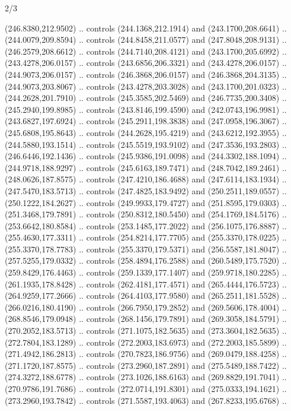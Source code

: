 \begin{flagdescription}{2/3}
\begin{scope}[xshift=0.5\flaglength,yshift=0.5\flagwidth,scale=\flagwidth/318.91]
\begin{scope}[y=0.8pt, x=0.8pt, yscale=-1,shift={(-298.97,-199.32)}]
  (246.8380,212.9502) .. controls (244.1368,212.1914) and (243.1700,208.6641) ..
  (244.0079,209.8594) .. controls (244.8458,211.0577) and (247.8048,208.9131) ..
  (246.2579,208.6612) .. controls (244.7140,208.4121) and (243.1700,205.6992) ..
  (243.4278,206.0157) .. controls (243.6856,206.3321) and (243.4278,206.0157) ..
  (244.9073,206.0157) .. controls (246.3868,206.0157) and (246.3868,204.3135) ..
  (244.9073,203.8067) .. controls (243.4278,203.3028) and (243.1700,201.0323) ..
  (244.2628,201.7910) .. controls (245.3585,202.5469) and (246.7735,200.3408) ..
  (245.2940,199.8985) .. controls (243.8146,199.4590) and (242.0743,196.9981) ..
  (243.6827,197.6924) .. controls (245.2911,198.3838) and (247.0958,196.3067) ..
  (245.6808,195.8643) .. controls (244.2628,195.4219) and (243.6212,192.3955) ..
  (244.5880,193.1514) .. controls (245.5519,193.9102) and (247.3536,193.2803) ..
  (246.6446,192.1436) .. controls (245.9386,191.0098) and (244.3302,188.1094) ..
  (244.9718,188.9297) .. controls (245.6163,189.7471) and (248.7042,189.2461) ..
  (248.0626,187.8575) .. controls (247.4210,186.4688) and (247.6114,183.1934) ..
  (247.5470,183.5713) .. controls (247.4825,183.9492) and (250.2511,189.0557) ..
  (250.1222,184.2627) .. controls (249.9933,179.4727) and (251.8595,179.0303) ..
  (251.3468,179.7891) .. controls (250.8312,180.5450) and (254.1769,184.5176) ..
  (253.6642,180.8584) .. controls (253.1485,177.2022) and (256.1075,176.8887) ..
  (255.4630,177.3311) .. controls (254.8214,177.7705) and (255.3370,178.0225) ..
  (255.3370,178.7783) .. controls (255.3370,179.5371) and (256.5587,181.8047) ..
  (257.5255,179.0332) .. controls (258.4894,176.2588) and (260.5489,175.7520) ..
  (259.8429,176.4463) .. controls (259.1339,177.1407) and (259.9718,180.2285) ..
  (261.1935,178.8428) .. controls (262.4181,177.4571) and (265.4444,176.5723) ..
  (264.9259,177.2666) .. controls (264.4103,177.9580) and (265.2511,181.5528) ..
  (266.0216,180.4190) .. controls (266.7950,179.2852) and (269.5606,178.4004) ..
  (268.8546,179.0948) .. controls (268.1456,179.7891) and (269.3058,184.5791) ..
  (270.2052,183.5713) .. controls (271.1075,182.5635) and (273.3604,182.5635) ..
  (272.7804,183.1289) .. controls (272.2003,183.6973) and (272.2003,185.5899) ..
  (271.4942,186.2813) .. controls (270.7823,186.9756) and (269.0479,188.4258) ..
  (271.1720,187.8575) .. controls (273.2960,187.2891) and (275.5489,188.7422) ..
  (274.3272,188.6778) .. controls (273.1026,188.6163) and (269.8829,191.7041) ..
  (270.9786,191.7686) .. controls (272.0714,191.8301) and (275.0333,194.1621) ..
  (273.2960,193.7842) .. controls (271.5587,193.4063) and (267.8233,195.6768) ..

\end{scope}
\end{scope}
\end{flagdescription}
